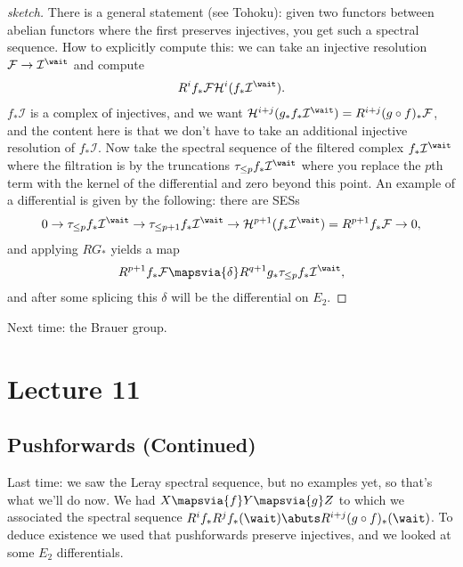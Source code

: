 \begin{proof}[sketch]

There is a general statement (see Tohoku): given two functors between
abelian functors where the first preserves injectives, you get such a
spectral sequence. How to explicitly compute this: we can take an
injective resolution \(\mathcal{F}\to \mathcal{I}^\wait\) and compute
\begin{align*}  
R^i f_* \mathcal{F} \mathcal{H}^i(f_* \mathcal{I}^\wait)
.\end{align*} \(f_* \mathcal{I}\) is a complex of injectives, and we
want
\(\mathcal{H}^{i+j}(g_* f_* \mathcal{I}^\wait) = R^{i+j}(g\circ f)_* \mathcal{F}\),
and the content here is that we don't have to take an additional
injective resolution of \(f_* \mathcal{I}\). Now take the spectral
sequence of the filtered complex \(f_* \mathcal{I}^\wait\) where the
filtration is by the truncations \(\tau_{\leq p}f_* \mathcal{I}^\wait\)
where you replace the \(p\)th term with the kernel of the differential
and zero beyond this point. An example of a differential is given by the
following: there are SESs
\begin{align*}  
0 \to
\tau_{\leq p} f_* \mathcal{I}^\wait
\to
\tau_{\leq p+1} f_* \mathcal{I}^\wait
\to
\mathcal{H}^{p+1}(f_* \mathcal{I}^\wait)  = R^{p+1} f_* \mathcal{F}
\to 
0
,\end{align*} and applying \(RG_*\) yields a map
\begin{align*}  
R^{p+1} f_* \mathcal{F}
\mapsvia{\delta}
R^{q+1} g_* \tau_{\leq p}f_* \mathcal{I}^\wait
,\end{align*} and after some splicing this \(\delta\) will be the
differential on \(E_2\).

\end{proof}

Next time: the Brauer group.

\hypertarget{lecture-11}{%
\section{Lecture 11}\label{lecture-11}}

\hypertarget{pushforwards-continued}{%
\subsection{Pushforwards (Continued)}\label{pushforwards-continued}}

Last time: we saw the Leray spectral sequence, but no examples yet, so
that's what we'll do now. We had \(X \mapsvia{f} Y \mapsvia{g} Z\) to
which we associated the spectral sequence
\(R^i f_* R^jf_*(\wait) \abuts R^{i+j}(g\circ f)_* (\wait)\). To deduce
existence we used that pushforwards preserve injectives, and we looked
at some \(E_2\) differentials.

